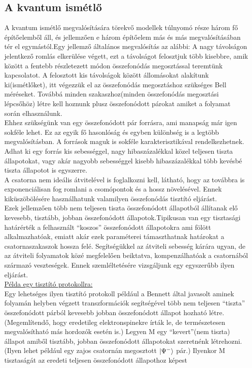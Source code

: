 \subsection{A kvantum ismétlő}
A kvantum ismétlő megvalósítására törekvő modellek túlnyomó része három fő építőelemből áll, és jellemzően e három építőelem más és más megvalósításában tér el egymástól.Egy jellemző általános megvalósítás az alábbi:
A nagy távolságon jelentkező romlás elkerülése végett, ezt a távolságot felosztjuk több kisebbre, amik között a fentebb részletezett módon összefonódás megosztással teremtünk kapcsolatot. A felosztott kis távolságok között állomásokat alakítunk ki(ismétlőket), itt végezzük el az összefonódás megosztáshoz szükséges Bell méréseket. Továbbá minden szakaszhoz(minden összefonódás megosztási lépcsőhöz) létre kell hoznunk plusz összefonódott párokat amiket a folyamat során elhasználunk.\\
 Ehhez szükségünk van egy összefonódott pár forrásra, ami manapság már igen sokféle lehet. %
Ez az egyik fő hasonlóság és egyben különbség is a legtöbb megvalósításban. A források maguk is sokféle karakterisztikával rendelkezhetnek. Adhat ki egy forrás kis sebességgel, nagy hibaszázalékkal közel teljesen tiszta állapotokat, vagy akár nagyobb sebességgel kisebb hibaszázalékkal több kevésbé tiszta állapotot is egyszerre.\\
 A csatorna nem ideális átvitelével is foglalkozni kell, látható, hogy az továbbra is exponenciálisan fog romlani a csomópontok és a hossz növelésével. Ennek kiküszöbölésére használhatunk valamilyen összefonódás tisztító eljárást.\\
 Ezek jellemzően több nem teljesen tiszta összefonódott állapotból állítanak elő kevesebb, tisztább, jobban összefonódott állapotok.Tipikusan van egy tisztasági határérték a felhasznált “koszos” összefonódott állapotokra ami fölött alkalmazhatóak, emiatt akár ezek paraméterei támaszthatnak határokat a csatornaszakaszok hossza felé. Segítségükkel az átviteli sebesség kárára ugyan, de az átviteli folyamatok közé megfelelően beiktatva, kompenzálhatóak a csatornából származó veszteségek. Ennek szemléltetésére vizsgáljunk egy egyszerűbb ilyen eljárást.\\
\underline{Példa egy tisztító protokollra:}\\
Egy lehetséges ilyen tisztító protokoll például a Bennett által javasolt\cite{bennett1996purification} aminek folyamán helyben végzett transzformációk segítségével több nem teljesen “tiszta” összefonódott párból kevesebb jobban összefonódott állapot hozható létre. (Megemlítendő, hogy eredetileg elektronspinekre írták le, de természetesen megvalósítható más hordozók esetén is.) Legyen M egy “kevert”(nem tiszta) állapot amiből tisztább, jobban összefonódott állapotokat szeretnénk létrehozni. (Ilyen lehet például egy zajos csatornán megosztott $ \ket{\Psi^-} $  pár.) Ilyenkor M tisztaságát az eredeti teljesen összefonódott állapothoz képest 
